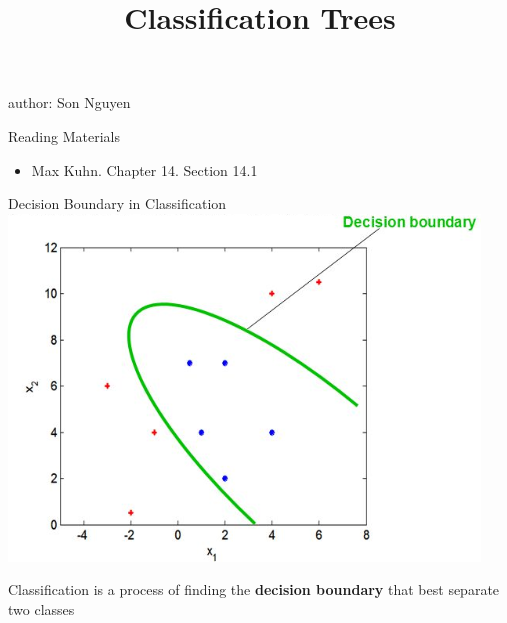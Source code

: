 \documentclass[
  ignorenonframetext,
]{beamer}
\title{Classification Trees}
\author{}
\date{\vspace{-2.5em}}
\providecommand{\tightlist}{%
  \setlength{\itemsep}{0pt}\setlength{\parskip}{0pt}}
\begin{document}
\frame{\titlepage}

\begin{frame}
author: Son Nguyen
\end{frame}

\begin{frame}{Reading Materials}
\label{reading-materials}
\begin{itemize}
\tightlist
\item
  Max Kuhn. Chapter 14. Section 14.1
\end{itemize}
\end{frame}

\begin{frame}{Decision Boundary in Classification}
\label{decision-boundary-in-classification}
\includegraphics{images/db.png}

Classification is a process of finding the \textbf{decision boundary}
that best separate two classes
\end{frame}
\end{document}
